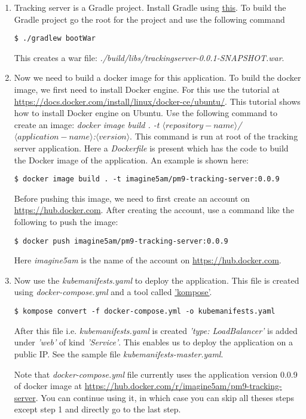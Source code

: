 \documentclass{article}
\begin{document}
\begin{enumerate}
\item 
Tracking server is a Gradle project. Install Gradle using \href{https://gradle.org}{this}. To build the Gradle project go the root for the project and use the following command
\begin{lstlisting}
$ ./gradlew bootWar
\end{lstlisting}
This creates a war file: \textit{./build/libs/trackingserver-0.0.1-SNAPSHOT.war}.
\item Now we need to build a docker image for this application. To build the docker image, we first need to install Docker engine. For this use the tutorial at \url{https://docs.docker.com/install/linux/docker-ce/ubuntu/}. This tutorial shows how to install Docker engine on Ubuntu. Use the following command to create an image: \textit{docker image build . -t $\langle repository-name\rangle$/$\langle application-name\rangle$:$\langle version\rangle$}. This command is run at root of the tracking server application. Here a \textit{Dockerfile} is present which has the code to build the Docker image of the application. An example is shown here:
\begin{lstlisting}
$ docker image build . -t imagine5am/pm9-tracking-server:0.0.9
\end{lstlisting}
Before pushing this image, we need to first create an account on  \url{https://hub.docker.com}. After creating the account, use a command like the following to push the image:
\begin{lstlisting}
$ docker push imagine5am/pm9-tracking-server:0.0.9
\end{lstlisting}
Here \textit{imagine5am} is the name of the account on \url{https://hub.docker.com}.
\item
Now use the \textit{kubemanifests.yaml} to deploy the application. This file is created using \textit{docker-compose.yml} and a tool called  \href{https://kompose.io}{'kompose'}.
\begin{lstlisting}
$ kompose convert -f docker-compose.yml -o kubemanifests.yaml
\end{lstlisting}
After this file i.e. \textit{kubemanifests.yaml} is created \textit{'type: LoadBalancer'} is added under \textit{'web'} of kind \textit{'Service'}. This enables us to deploy the application on a public IP. See the sample file \textit{kubemanifests-master.yaml}.
\par
Note that \textit{docker-compose.yml} file currently uses the application version 0.0.9 of docker image at \url{https://hub.docker.com/r/imagine5am/pm9-tracking-server}. You can continue using it, in which case you can skip all theses steps except step 1 and directly go to the last step.

\end{enumerate}
\end{document}
